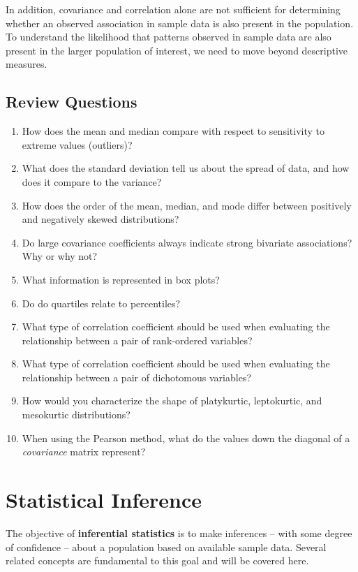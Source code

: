 \documentclass[
]{book}
\begin{document}
In addition, covariance and correlation alone are not sufficient for determining whether an observed association in sample data is also present in the population. To understand the likelihood that patterns observed in sample data are also present in the larger population of interest, we need to move beyond descriptive measures.

\hypertarget{review-questions-5}{%
\section{Review Questions}\label{review-questions-5}}

\begin{enumerate}
\def\labelenumi{\arabic{enumi}.}
\item
  How does the mean and median compare with respect to sensitivity to extreme values (outliers)?
\item
  What does the standard deviation tell us about the spread of data, and how does it compare to the variance?
\item
  How does the order of the mean, median, and mode differ between positively and negatively skewed distributions?
\item
  Do large covariance coefficients always indicate strong bivariate associations? Why or why not?
\item
  What information is represented in box plots?
\item
  Do do quartiles relate to percentiles?
\item
  What type of correlation coefficient should be used when evaluating the relationship between a pair of rank-ordered variables?
\item
  What type of correlation coefficient should be used when evaluating the relationship between a pair of dichotomous variables?
\item
  How would you characterize the shape of platykurtic, leptokurtic, and mesokurtic distributions?
\item
  When using the Pearson method, what do the values down the diagonal of a \emph{covariance} matrix represent?
\end{enumerate}

\hypertarget{inf-stats}{%
\chapter{Statistical Inference}\label{inf-stats}}

The objective of \textbf{inferential statistics} is to make inferences -- with some degree of confidence -- about a population based on available sample data. Several related concepts are fundamental to this goal and will be covered here.
\end{document}
